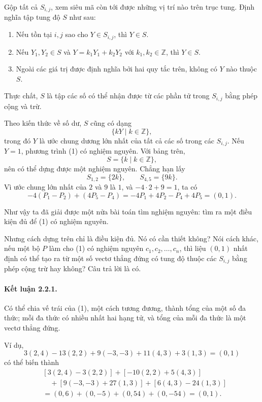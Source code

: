 \documentclass[11pt]{article}
\newcommand{\Z}{\mathbb{Z}}
\begin{document}
Gộp tất cả \(S_{i,j}\), xem siêu mã còn tới được những vị trí nào trên trục
tung. Định nghĩa tập tung độ \(S\) như sau:
\begin{enumerate}
  \item Nếu tồn tại \(i,j\) sao cho \(Y\in S_{i,j}\), thì \(Y\in S\).
  \item Nếu \(Y_1,Y_2\in S\) và \(Y=k_1Y_1+k_2Y_2\) với \(k_1,k_2\in\Z\), thì
  \(Y\in S\).
  \item Ngoài các giá trị được định nghĩa bởi hai quy tắc trên, không có
  \(Y\) nào thuộc \(S\).
\end{enumerate}
Thực chất, \(S\) là tập các số có thể nhận được từ các phần tử trong
\(S_{i,j}\) bằng phép cộng và trừ.

Theo kiến thức về số dư, \(S\) cũng có dạng
\[
  \{kY\mid k\in\Z\},
\]
trong đó \(Y\) là ước chung dương lớn nhất của tất cả các số trong các
\(S_{i,j}\). Nếu \(Y=1\), phương trình (1) có nghiệm nguyên. Với bảng trên,
\[
  S=\{k\mid k\in\Z\},
\]
nên có thể dựng được một nghiệm nguyên. Chẳng hạn lấy
\[
S_{1,2}=\{2k\},\qquad S_{4,5}=\{9k\}.
\]
Vì ước chung lớn nhất của \(2\) và \(9\) là \(1\), và \(-4\cdot2+9=1\), ta có
\[
  -4(P_1-P_2)+(4P_5-P_4)=-4P_1+4P_2-P_4+4P_5=(0,1).
\]

Như vậy ta đã giải được một nửa bài toán tìm nghiệm nguyên: tìm ra một điều
kiện đủ để (1) có nghiệm nguyên.

Nhưng cách dựng trên chỉ là điều kiện đủ. Nó có cần thiết không? Nói cách
khác, nếu một bộ \(P\) làm cho (1) có nghiệm nguyên
\(c_1,c_2,\ldots,c_n\), thì liệu \((0,1)\) nhất định có thể tạo ra từ một số
vectơ thẳng đứng có tung độ thuộc các \(S_{i,j}\) bằng phép cộng trừ hay
không? Câu trả lời là có.

\paragraph{Kết luận 2.2.1.}
Có thể chia vế trái của (1), một cách tương đương, thành tổng của một số đa
thức; mỗi đa thức có nhiều nhất hai hạng tử, và tổng của mỗi đa thức là một
vectơ thẳng đứng.

Ví dụ,
\[
  3(2,4)-13(2,2)+9(-3,-3)+11(4,3)+3(1,3)=(0,1)
\]
có thể biến thành
\[
\begin{aligned}
&[3(2,4)-3(2,2)]
+[-10(2,2)+5(4,3)]\\
&\quad +[9(-3,-3)+27(1,3)]
+[6(4,3)-24(1,3)]\\
&=(0,6)+(0,-5)+(0,54)+(0,-54)=(0,1).
\end{aligned}
\]
\end{document}
